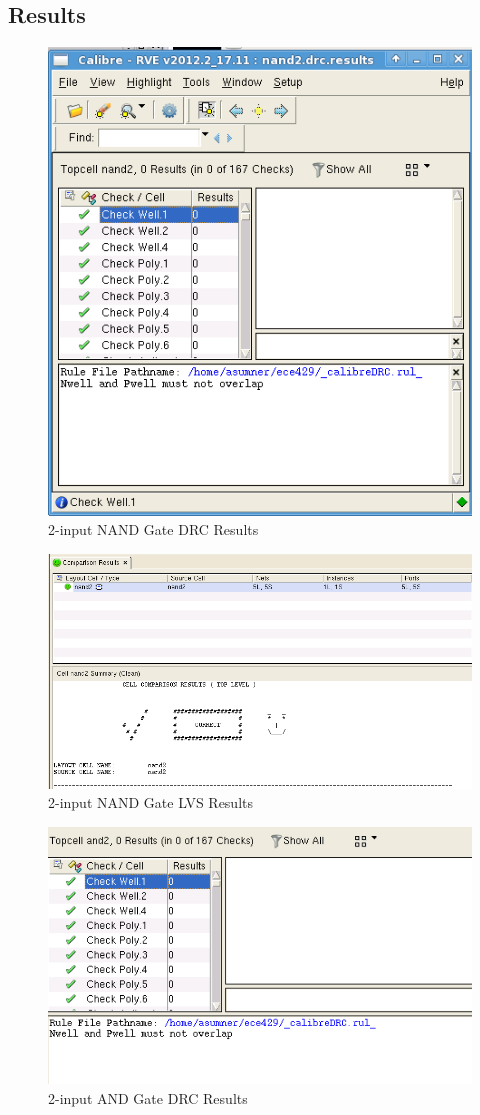 \documentclass[12pt]{article}
\begin{document}
\subsection{Results}
\begin{figure}[H]
\centering
\includegraphics[width=0.7\linewidth]{drc-nand2}
\caption{2-input NAND Gate DRC Results}
\label{fig:drc-nand2}
\end{figure}

\begin{figure}[H]
\centering
\includegraphics[width=0.7\linewidth]{nand2-lvs}
\caption{2-input NAND Gate LVS Results}
\label{fig:nand2-lvs}
\end{figure}

\begin{figure}[H]
\centering
\includegraphics[width=0.7\linewidth]{and2-drc}
\caption{2-input AND Gate DRC Results}
\label{fig:and2-drc}
\end{figure}
\end{document}
